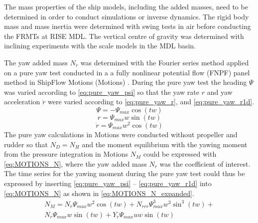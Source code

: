 The mass properties of the ship models, including the added masses, need to be determined in order to conduct simulations or inverse dynamics. The rigid body mass and mass inertia were determined with swing tests in air before conducting the FRMTs at RISE MDL. The vertical centre of gravity was determined with inclining experiments with the scale models in the MDL basin.

The yaw added mass $N_{\dot{r}}$ was determined with the Fourier series method \citep{sakamotoURANSSimulationsStatic2012} applied on a pure yaw test conducted in a a fully nonlinear potential flow (FNPF) panel method in ShipFlow Motions (Motions) \citep{kjellbergFullyNonlinearUnsteady2013}.
During the pure yaw test the heading $\Psi$ was varied according to \autoref{eq:pure_yaw_psi} so that the yaw rate $r$ and yaw acceleration $\dot{r}$ were varied according to \autoref{eq:pure_yaw_r}, and \autoref{eq:pure_yaw_r1d}.
\begin{equation}
    \Psi = - \Psi_{max} \cos{\left(t w \right)}
    \label{eq:pure_yaw_psi}
\end{equation}
\begin{equation}
    r = \Psi_{max} w \sin{\left(t w \right)}
    \label{eq:pure_yaw_r}
\end{equation}
\begin{equation}
    \dot{r} = \Psi_{max} w^{2} \cos{\left(t w \right)}
    \label{eq:pure_yaw_r1d}
\end{equation}
The pure yaw calculations in Motions were conducted without propeller and rudder so that $N_D=N_H$ and the moment equilibrium with the yawing moment from the pressure integration in Motions $N_M$ could be expressed with \autoref{eq:MOTIONS_N}, where the yaw added mass $N_{\dot{r}}$ was the coefficient of interest. 
\begin{equation}
    
    \label{eq:MOTIONS_N}
\end{equation}
The time series for the yawing moment during the pure yaw test could thus be expressed by inserting \autoref{eq:pure_yaw_psi} -- \autoref{eq:pure_yaw_r1d} into \autoref{eq:MOTIONS_N} as shown in \autoref{eq:MOTIONS_N_expanded}.
\begin{equation}
    \begin{align}    
    N_{M} = N_{\dot{r}} \Psi_{max} w^{2} \cos{\left(t w \right)} + N_{rrr} \Psi_{max}^{3} w^{3} \sin^{3}{\left(t w \right)} + \\ 
    N_{r} \Psi_{max} w \sin{\left(t w \right)} + Y_{\dot{r}} \Psi_{max} u w \sin{\left(t w \right)}
    \end{align}
    \label{eq:MOTIONS_N_expanded}
\end{equation}
